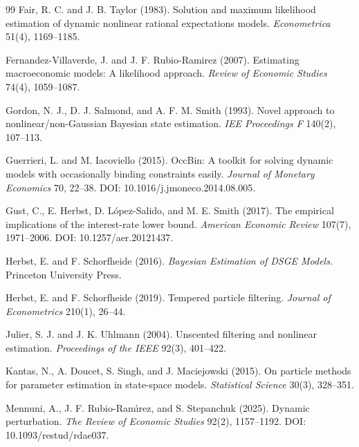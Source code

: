 \documentclass[11pt]{article}
\theoremstyle{remark}
\begin{document}
\begin{thebibliography}{99}
Fair, R. C. and J. B. Taylor (1983).
\newblock Solution and maximum likelihood estimation of dynamic nonlinear rational expectations models.
\newblock \emph{Econometrica} 51(4), 1169--1185.

Fernandez-Villaverde, J. and J. F. Rubio-Ramirez (2007).
\newblock Estimating macroeconomic models: A likelihood approach.
\newblock \emph{Review of Economic Studies} 74(4), 1059--1087.

Gordon, N. J., D. J. Salmond, and A. F. M. Smith (1993).
\newblock Novel approach to nonlinear/non-Gaussian Bayesian state estimation.
\newblock \emph{IEE Proceedings F} 140(2), 107--113.

Guerrieri, L. and M. Iacoviello (2015).
\newblock OccBin: A toolkit for solving dynamic models with occasionally binding constraints easily.
\newblock \emph{Journal of Monetary Economics} 70, 22--38.
\newblock DOI: 10.1016/j.jmoneco.2014.08.005.

Gust, C., E. Herbst, D. L{\'o}pez-Salido, and M. E. Smith (2017).
\newblock The empirical implications of the interest-rate lower bound.
\newblock \emph{American Economic Review} 107(7), 1971--2006.
\newblock DOI: 10.1257/aer.20121437.

Herbst, E. and F. Schorfheide (2016).
\newblock \emph{Bayesian Estimation of DSGE Models}.
\newblock Princeton University Press.

Herbst, E. and F. Schorfheide (2019).
\newblock Tempered particle filtering.
\newblock \emph{Journal of Econometrics} 210(1), 26--44.

Julier, S. J. and J. K. Uhlmann (2004).
\newblock Unscented filtering and nonlinear estimation.
\newblock \emph{Proceedings of the IEEE} 92(3), 401--422.

Kantas, N., A. Doucet, S. Singh, and J. Maciejowski (2015).
\newblock On particle methods for parameter estimation in state-space models.
\newblock \emph{Statistical Science} 30(3), 328--351.

Mennuni, A., J. F. Rubio-Ram{\'\i}rez, and S. Stepanchuk (2025).
\newblock Dynamic perturbation.
\newblock \emph{The Review of Economic Studies} 92(2), 1157--1192.
\newblock DOI: 10.1093/restud/rdae037.


\end{thebibliography}
\end{document}
